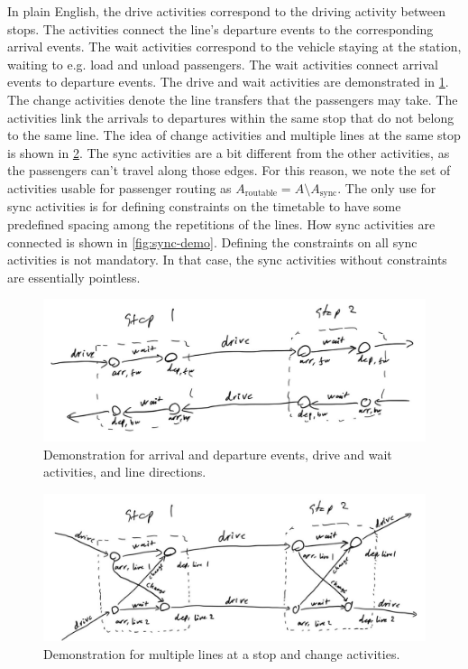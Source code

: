 \documentclass[english, 12pt, a4paper, sci, utf8, a-2b, online]{aaltothesis}
\begin{document}
In plain English, the drive activities correspond to the driving activity between stops. The activities connect the line's departure events to the corresponding arrival events. The wait activities correspond to the vehicle staying at the station, waiting to e.g. load and unload passengers. The wait activities connect arrival events to departure events. The drive and wait activities are demonstrated in \cref{fig:drive-wait-demo}. The change activities denote the line transfers that the passengers may take. The activities link the arrivals to departures within the same stop that do not belong to the same line. The idea of change activities and multiple lines at the same stop is shown in \cref{fig:change-demo}. The sync activities are a bit different from the other activities, as the passengers can't travel along those edges. For this reason, we note the set of activities usable for passenger routing as $A_\text{routable} = A \setminus A_\text{sync}$. The only use for sync activities is for defining constraints on the timetable to have some predefined spacing among the repetitions of the lines. How sync activities are connected is shown in \cref{fig:sync-demo}. Defining the constraints on all sync activities is not mandatory. In that case, the sync activities without constraints are essentially pointless.


\begin{figure}
    \centering
    \includegraphics[width=1.0\textwidth]{figures/drive-wait-demo.jpg}
    \caption{Demonstration for arrival and departure events, drive and wait activities, and line directions.}
    \label{fig:drive-wait-demo}
\end{figure}

\begin{figure}
    \centering
    \includegraphics[width=1.0\textwidth]{figures/change-demo.jpg}
    \caption{Demonstration for multiple lines at a stop and change activities.}
    \label{fig:change-demo}
\end{figure}
\end{document}
